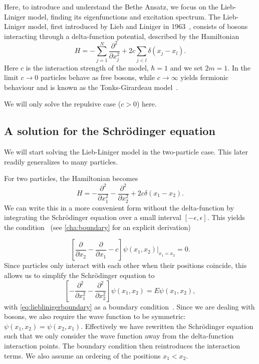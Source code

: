 \documentclass[11pt, a4paper]{report} %
\begin{document}
Here, to introduce and understand the Bethe Ansatz, we focus on the Lieb-Liniger model, finding its eigenfunctions and excitation spectrum.
The Lieb-Liniger model, first introduced by Lieb and Liniger in 1963~\cite{Lieb1963, Lieb1963a}, consists of bosons interacting through a delta-function potential, described by the Hamiltonian
\begin{equation}
	H = - \sum_{j=1}^{N} \frac{\partial^2}{\partial x_j^2} + 2c \sum_{j<l} \delta(x_j - x_l).
\end{equation}
Here \(c\) is the interaction strength of the model, \(\hbar=1\) and we set \(2m=1\).
In the limit \(c\to0\) particles behave as free bosons, while \(c\to\infty\) yields fermionic behaviour and is known as the Tonks-Girardeau model~\cite{Lieb1963, Franchini2017}.

We will only solve the repulsive case (\(c > 0\)) here.

\subsection{A solution for the Schrödinger equation}

We will start solving the Lieb-Liniger model in the two-particle case. This later readily generalizes to many particles.

For two particles, the Hamiltonian becomes
\begin{equation}
	H =  - \frac{\partial^2}{\partial x_1^2} - \frac{\partial^2}{\partial x_2^2} + 2c \delta(x_1 - x_2).
\end{equation}
We can write this in a more convenient form without the delta-function by integrating the Schrödinger equation over a small interval \([-\epsilon,\epsilon]\).
This yields the condition~\cite{Lieb1963} (see \cref{cha:boundary} for an explicit derivation)

\begin{equation}\label{eq:lieblinigerboundary}
	\left[\frac{\partial}{\partial x_2} - \frac{\partial}{\partial x_1} - c\right] \psi(x_1, x_2)\bigg\rvert_{x_1 = x_2} = 0.
\end{equation}
Since particles only interact with each other when their positions coincide, this allows us to simplify the Schrödinger equation to
\begin{equation}\label{eq:lieblinigersimple}
	\left[- \frac{\partial^2}{\partial x_1^2} - \frac{\partial^2}{\partial x_2^2}\right] \psi(x_1, x_2) = E \psi(x_1,x_2),
\end{equation}
with \cref{eq:lieblinigerboundary} as a boundary condition~\cite{Lieb1963}.
Since we are dealing with bosons, we also require the wave function to be symmetric: \(\psi(x_1,x_2) = \psi(x_2,x_1)\).
Effectively we have rewritten the Schrödinger equation such that we only consider the wave function away from the delta-function interaction points.
The boundary condition then reintroduces the interaction terms.
We also assume an ordering of the positions \(x_1 < x_2\).
\end{document}
